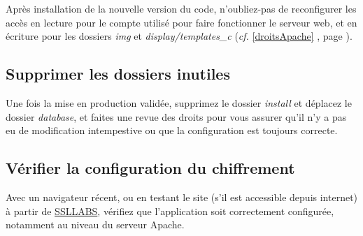 Après installation de la nouvelle version du code, n'oubliez-pas de reconfigurer les accès en lecture pour le compte utilisé pour faire fonctionner le serveur web, et en écriture pour les dossiers \textit{img} et \textit{display/templates\_c} (\textit{cf.} \ref{droitsApache} \textit{}, page \pageref{droitsApache}).

\subsection{Supprimer les dossiers inutiles}
Une fois la mise en production validée, supprimez le dossier \textit{install} et déplacez le dossier \textit{database}, et faites une revue des droits pour vous assurer qu'il n'y a pas eu de modification intempestive ou que la configuration est toujours correcte.

\subsection{Vérifier la configuration du chiffrement}
Avec un navigateur récent, ou en testant le site (s'il est accessible depuis internet) à partir de \href{https://www.ssllabs.com/ssltest/}{SSLLABS}, vérifiez que l'application soit correctement configurée, notamment au niveau du serveur Apache.